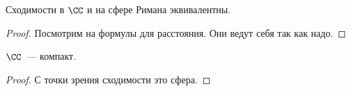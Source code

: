 \begin{consequence}
    Сходимости в $\CC$ и на сфере Римана эквивалентны.
\end{consequence}

\begin{proof}
    Посмотрим на формулы для расстояния.
    Они ведут себя так как надо.
\end{proof}

\begin{consequence}
    $\CC$~--- компакт.
\end{consequence}

\begin{proof}
    С точки зрения сходимости это сфера.
\end{proof}
